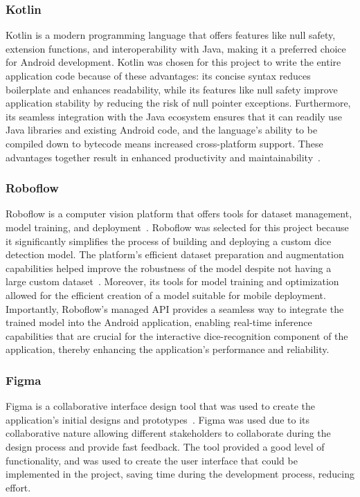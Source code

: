\subsubsection{Kotlin}
\label{sec:kotlin}
Kotlin is a modern programming language that offers features like null safety, extension functions, and interoperability with Java, making it a preferred choice for Android development. Kotlin was chosen for this project to write the entire application code because of these advantages: its concise syntax reduces boilerplate and enhances readability, while its features like null safety improve application stability by reducing the risk of null pointer exceptions. Furthermore, its seamless integration with the Java ecosystem ensures that it can readily use Java libraries and existing Android code, and the language's ability to be compiled down to bytecode means increased cross-platform support. These advantages together result in enhanced productivity and maintainability~\cite{bib:kotlin}.

\subsubsection{Roboflow}
\label{sec:roboflow}
Roboflow is a computer vision platform that offers tools for dataset management, model training, and deployment~\cite{bib:roboflow}. Roboflow was selected for this project because it significantly simplifies the process of building and deploying a custom dice detection model. The platform's efficient dataset preparation and augmentation capabilities helped improve the robustness of the model despite not having a large custom dataset~\cite{bib:kavidataset}. Moreover, its tools for model training and optimization allowed for the efficient creation of a model suitable for mobile deployment. Importantly, Roboflow's managed API provides a seamless way to integrate the trained model into the Android application, enabling real-time inference capabilities that are crucial for the interactive dice-recognition component of the application, thereby enhancing the application's performance and reliability.

\subsubsection{Figma}
\label{sec:figma}
Figma is a collaborative interface design tool that was used to create the application's initial designs and prototypes~\cite{bib:figma}. Figma was used due to its collaborative nature allowing different stakeholders to collaborate during the design process and provide fast feedback. The tool provided a good level of functionality, and was used to create the user interface that could be implemented in the project, saving time during the development process, reducing effort.

